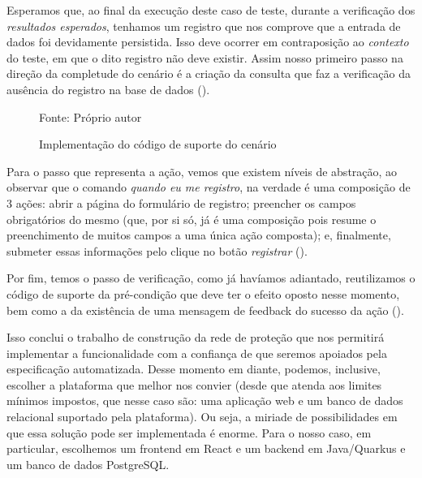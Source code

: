   Esperamos que, ao final da execução deste caso de teste, durante a verificação dos \emph{resultados esperados}, tenhamos um registro que nos comprove que a entrada de dados foi devidamente persistida. Isso deve ocorrer em contraposição ao \emph{contexto} do teste, em que o dito registro não deve existir. Assim nosso primeiro passo na direção da completude do cenário é a criação da consulta que faz a verificação da ausência do registro na base de dados ().

  \begin{figure}[h]
    \centering
    \caption{Implementação do código de suporte do cenário}
    \small{Fonte: Próprio autor}
    \label{fig:suporte-cenario}
  \end{figure}

  Para o passo que representa a ação, vemos que existem níveis de abstração, ao observar que o comando \emph{quando eu me registro}, na verdade é uma composição de 3 ações: abrir a página do formulário de registro; preencher os campos obrigatórios do mesmo (que, por si só, já é uma composição pois resume o preenchimento de muitos campos a uma única ação composta); e, finalmente, submeter essas informações pelo clique no botão \emph{registrar} ().

  Por fim, temos o passo de verificação, como já havíamos adiantado, reutilizamos o código de suporte da pré-condição que deve ter o efeito oposto nesse momento, bem como a da existência de uma mensagem de feedback do sucesso da ação ().

  Isso conclui o trabalho de construção da rede de proteção que nos permitirá implementar a funcionalidade com a confiança de que seremos apoiados pela especificação automatizada. Desse momento em diante, podemos, inclusive, escolher a plataforma que melhor nos convier (desde que atenda aos limites mínimos impostos, que nesse caso são: uma aplicação web e um banco de dados relacional suportado pela plataforma). Ou seja, a miriade de possibilidades em que essa solução pode ser implementada é enorme. Para o nosso caso, em particular, escolhemos um frontend em React e um backend em Java/Quarkus e um banco de dados PostgreSQL.

